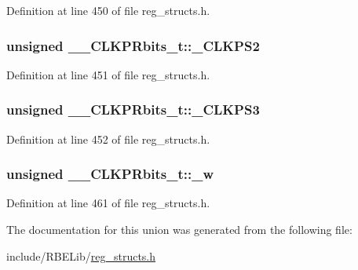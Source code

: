 Definition at line 450 of file reg\+\_\+structs.\+h.

\hypertarget{union_____c_l_k_p_rbits__t_a13435b83e03b4a80053a69fb95a40a88}{
\subsubsection[{\+\_\+\+C\+L\+K\+P\+S2}]{\setlength{\rightskip}{0pt plus 5cm}unsigned \+\_\+\+\_\+\+C\+L\+K\+P\+Rbits\+\_\+t\+::\+\_\+\+C\+L\+K\+P\+S2}}\label{union_____c_l_k_p_rbits__t_a13435b83e03b4a80053a69fb95a40a88}


Definition at line 451 of file reg\+\_\+structs.\+h.

\hypertarget{union_____c_l_k_p_rbits__t_a4922be5fcb6d05dcbef968fe24bbddd9}{
\subsubsection[{\+\_\+\+C\+L\+K\+P\+S3}]{\setlength{\rightskip}{0pt plus 5cm}unsigned \+\_\+\+\_\+\+C\+L\+K\+P\+Rbits\+\_\+t\+::\+\_\+\+C\+L\+K\+P\+S3}}\label{union_____c_l_k_p_rbits__t_a4922be5fcb6d05dcbef968fe24bbddd9}


Definition at line 452 of file reg\+\_\+structs.\+h.

\hypertarget{union_____c_l_k_p_rbits__t_a0de45f468d3a9cc657bffdefd555ac22}{
\subsubsection[{\+\_\+w}]{\setlength{\rightskip}{0pt plus 5cm}unsigned \+\_\+\+\_\+\+C\+L\+K\+P\+Rbits\+\_\+t\+::\+\_\+w}}\label{union_____c_l_k_p_rbits__t_a0de45f468d3a9cc657bffdefd555ac22}


Definition at line 461 of file reg\+\_\+structs.\+h.



The documentation for this union was generated from the following file\+:\begin{DoxyCompactItemize}
\item 
include/\+R\+B\+E\+Lib/\hyperlink{reg__structs_8h}{reg\+\_\+structs.\+h}\end{DoxyCompactItemize}

